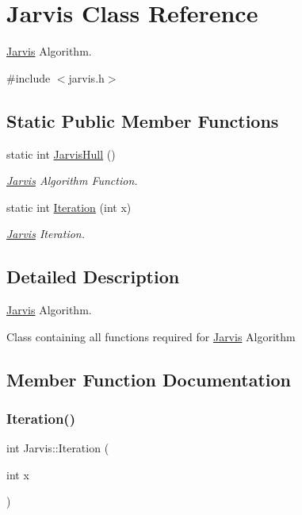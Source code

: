 \hypertarget{class_jarvis}{}\section{Jarvis Class Reference}
\label{class_jarvis}


\mbox{\hyperlink{class_jarvis}{Jarvis}} Algorithm.  




{\ttfamily \#include $<$jarvis.\+h$>$}

\subsection*{Static Public Member Functions}
\begin{DoxyCompactItemize}
\item 
static int \mbox{\hyperlink{class_jarvis_ac308172763e2c419813f17161ae539ef}{Jarvis\+Hull}} ()
\begin{DoxyCompactList}\small\item\em \mbox{\hyperlink{class_jarvis}{Jarvis}} Algorithm Function. \end{DoxyCompactList}\item 
static int \mbox{\hyperlink{class_jarvis_a1606008bb408256faf44e4267e022342}{Iteration}} (int x)
\begin{DoxyCompactList}\small\item\em \mbox{\hyperlink{class_jarvis}{Jarvis}} Iteration. \end{DoxyCompactList}\end{DoxyCompactItemize}


\subsection{Detailed Description}
\mbox{\hyperlink{class_jarvis}{Jarvis}} Algorithm. 

Class containing all functions required for \mbox{\hyperlink{class_jarvis}{Jarvis}}\textquotesingle{} Algorithm 

\subsection{Member Function Documentation}
\mbox{\label{class_jarvis_a1606008bb408256faf44e4267e022342}} 
\subsubsection{\texorpdfstring{Iteration()}{Iteration()}}
{\footnotesize\ttfamily int Jarvis\+::\+Iteration (\begin{DoxyParamCaption}\item[{int}]{x }\end{DoxyParamCaption})\hspace{0.3cm}{\ttfamily [static]}}



